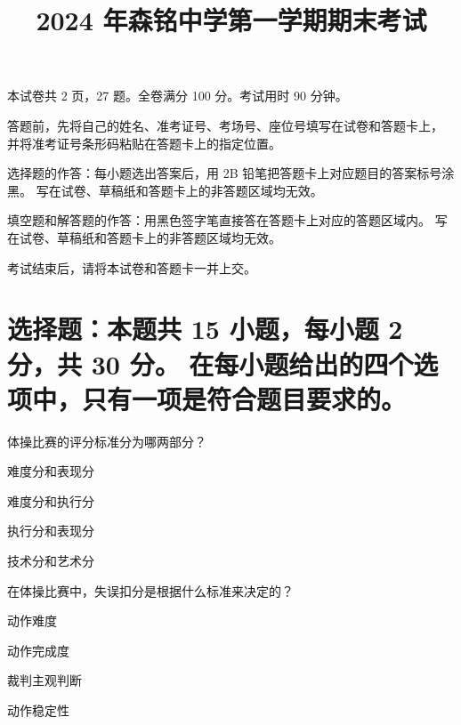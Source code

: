 \documentclass{exam-zh}
\title{2024 年森铭中学第一学期期末考试}
\begin{document}

\secret

\maketitle

本试卷共 2 页，27 题。全卷满分 100 分。考试用时 90 分钟。


\begin{notice}
  \item 答题前，先将自己的姓名、准考证号、考场号、座位号填写在试卷和答题卡上，
    并将准考证号条形码粘贴在答题卡上的指定位置。
  \item 选择题的作答：每小题选出答案后，用 2B 铅笔把答题卡上对应题目的答案标号涂黑。
    写在试卷、草稿纸和答题卡上的非答题区域均无效。
  \item 填空题和解答题的作答：用黑色签字笔直接答在答题卡上对应的答题区域内。
    写在试卷、草稿纸和答题卡上的非答题区域均无效。
  \item 考试结束后，请将本试卷和答题卡一并上交。
\end{notice}





\section{%
  选择题：本题共 15 小题，每小题 2 分，共 30 分。
  在每小题给出的四个选项中，只有一项是符合题目要求的。
}




\begin{question}[points = 2]
    体操比赛的评分标准分为哪两部分？
    \begin{choices}
    \item 难度分和表现分
    \item 难度分和执行分
    \item 执行分和表现分
    \item 技术分和艺术分
    \end{choices}
    \end{question}
    
    \begin{question}[points = 2]
    在体操比赛中，失误扣分是根据什么标准来决定的？
    \begin{choices}
    \item 动作难度
    \item 动作完成度
    \item 裁判主观判断
    \item 动作稳定性
    \end{choices}
    \end{question}
    
\end{document}
